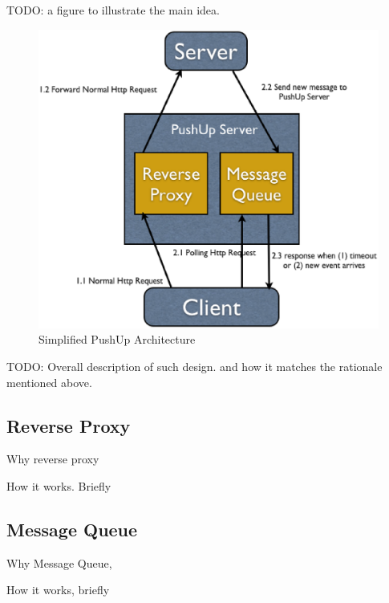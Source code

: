 TODO: a figure to illustrate the main idea.

\begin{figure}[htb!]
\centering%
    \includegraphics[scale=0.40]{figures/simple_pushup_arch.eps}
    \caption{Simplified PushUp Architecture}
    \label{fig:eventloop}
\end{figure}

TODO: Overall description of such design. and how it matches the rationale mentioned above.


\subsection{Reverse Proxy\\}

Why reverse proxy

How it works. Briefly

\subsection{Message Queue\\}

Why Message Queue, 

How it works, briefly


